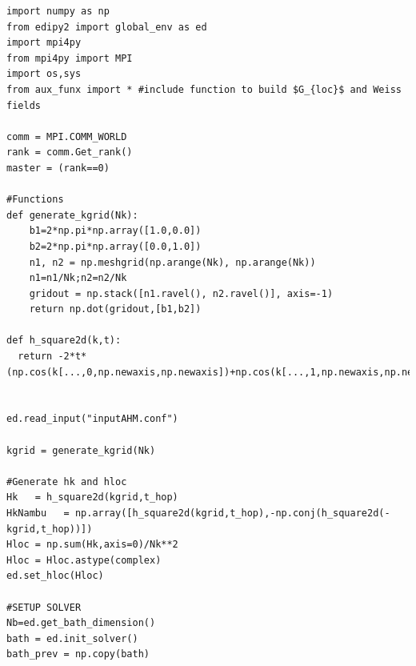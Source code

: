 \begin{lstlisting}[style=mypython,numbers=none,basicstyle={\scriptsize\ttfamily}]
import numpy as np
from edipy2 import global_env as ed
import mpi4py
from mpi4py import MPI
import os,sys
from aux_funx import * #include function to build $G_{loc}$ and Weiss fields

comm = MPI.COMM_WORLD
rank = comm.Get_rank()
master = (rank==0)

#Functions
def generate_kgrid(Nk):
    b1=2*np.pi*np.array([1.0,0.0])
    b2=2*np.pi*np.array([0.0,1.0])
    n1, n2 = np.meshgrid(np.arange(Nk), np.arange(Nk))
    n1=n1/Nk;n2=n2/Nk
    gridout = np.stack([n1.ravel(), n2.ravel()], axis=-1)
    return np.dot(gridout,[b1,b2])

def h_square2d(k,t):
  return -2*t*(np.cos(k[...,0,np.newaxis,np.newaxis])+np.cos(k[...,1,np.newaxis,np.newaxis]))*np.eye(ed.Norb)
    

ed.read_input("inputAHM.conf")

kgrid = generate_kgrid(Nk)

#Generate hk and hloc
Hk   = h_square2d(kgrid,t_hop)
HkNambu   = np.array([h_square2d(kgrid,t_hop),-np.conj(h_square2d(-kgrid,t_hop))])
Hloc = np.sum(Hk,axis=0)/Nk**2
Hloc = Hloc.astype(complex)
ed.set_hloc(Hloc)

#SETUP SOLVER
Nb=ed.get_bath_dimension()
bath = ed.init_solver()
bath_prev = np.copy(bath)
\end{lstlisting}




